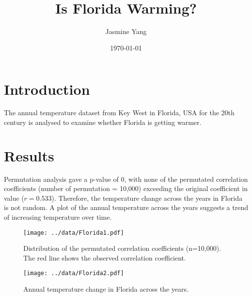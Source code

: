 \documentclass[12pt, a4paper]{article}
\title{Is Florida Warming?}
\author{Jasmine Yang}
\date{\today}
\begin{document}
  \thispagestyle{empty}  
  \maketitle

  
  \section*{Introduction}
  The annual temperature dataset from Key West in Florida, USA for the 20th century is analysed to examine   whether Florida is getting warmer.
  
  
  \section*{Results}
    Permutation analysis gave a p-value of 0, with none of the 	permutated correlation coefficients (number of permutation = 10,000) exceeding the original coefficient in value ($r = 0.533$).
Therefore, the temperature change across the years in Florida is not random.
A plot of the annual temperature across the years suggests a trend of increasing temperature over time. 

  \begin{figure}[h]
  \begin{center}
    \texttt{[image: ../data/Florida1.pdf]}    
    \label{Fig1}
    \caption{Distribution of the permutated correlation coefficients (n=10,000). The red line shows the observed correlation coefficient.}
  \end{center}
  \end{figure}
  
  
  \begin{figure}[h]
  \begin{center}
  \texttt{[image: ../data/Florida2.pdf]}
    \label{Fig2}
    \caption{Annual temperature change in Florida across the years. }  
  \end{center}
  \end{figure}
\end{document}
